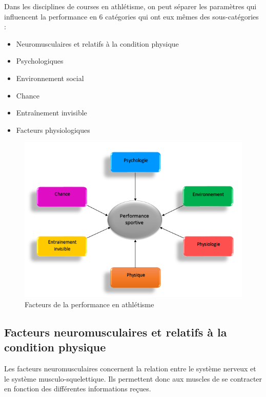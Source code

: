         Dans les disciplines de courses en athlétisme, on peut séparer les paramètres qui influencent la performance en 6 catégories qui ont eux mêmes des sous-catégories : 
        \begin{itemize}
            \item Neuromusculaires et relatifs à la condition physique
            \item Psychologiques
            \item Environnement social
            \item Chance
            \item Entraînement invisible
            \item Facteurs physiologiques
        \end{itemize}

        \begin{figure}[H]
            \centering
            \includegraphics[scale=0.7]{images/facteursPerf}
            \caption{\label{fig:filieres-energetiques}Facteurs de la performance en athlétisme}
        \end{figure}
        
        \subsection{Facteurs neuromusculaires et relatifs à la condition physique}
        
        Les facteurs neuromusculaires concernent la relation entre le système nerveux et le système musculo-squelettique. Ils permettent donc aux muscles de se contracter en fonction des différentes informations reçues.\\
        
